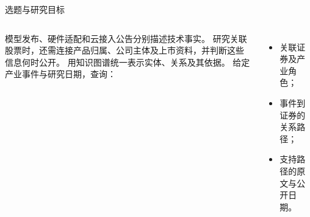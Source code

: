 \begin{frame}{选题与研究目标}\relax
{}
\begin{columns}[T,onlytextwidth]
模型发布、硬件适配和云接入公告分别描述技术事实。
\Gap
研究关联股票时，还需连接产品归属、公司主体及上市资料，并判断这些信息何时公开。
用知识图谱统一表示实体、关系及其依据\Cite{hogan2021}。
\Gap
给定产业事件与研究日期，查询：
\begin{itemize}
\item 关联证券及产业角色；
\item 事件到证券的关系路径；
\item 支持路径的原文与公开日期。
\end{itemize}
\end{columns}
\end{frame}
